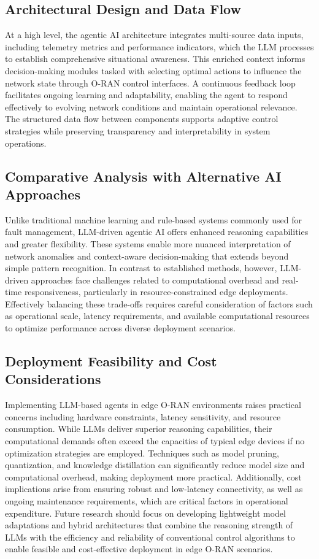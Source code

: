 \documentclass[sigconf]{acmart}
\begin{document}
\subsection{Architectural Design and Data Flow}
At a high level, the agentic AI architecture integrates multi-source data inputs, including telemetry metrics and performance indicators, which the LLM processes to establish comprehensive situational awareness. This enriched context informs decision-making modules tasked with selecting optimal actions to influence the network state through O-RAN control interfaces. A continuous feedback loop facilitates ongoing learning and adaptability, enabling the agent to respond effectively to evolving network conditions and maintain operational relevance. The structured data flow between components supports adaptive control strategies while preserving transparency and interpretability in system operations.

\subsection{Comparative Analysis with Alternative AI Approaches}
Unlike traditional machine learning and rule-based systems commonly used for fault management, LLM-driven agentic AI offers enhanced reasoning capabilities and greater flexibility. These systems enable more nuanced interpretation of network anomalies and context-aware decision-making that extends beyond simple pattern recognition. In contrast to established methods, however, LLM-driven approaches face challenges related to computational overhead and real-time responsiveness, particularly in resource-constrained edge deployments. Effectively balancing these trade-offs requires careful consideration of factors such as operational scale, latency requirements, and available computational resources to optimize performance across diverse deployment scenarios.

\subsection{Deployment Feasibility and Cost Considerations}
Implementing LLM-based agents in edge O-RAN environments raises practical concerns including hardware constraints, latency sensitivity, and resource consumption. While LLMs deliver superior reasoning capabilities, their computational demands often exceed the capacities of typical edge devices if no optimization strategies are employed. Techniques such as model pruning, quantization, and knowledge distillation can significantly reduce model size and computational overhead, making deployment more practical. Additionally, cost implications arise from ensuring robust and low-latency connectivity, as well as ongoing maintenance requirements, which are critical factors in operational expenditure. Future research should focus on developing lightweight model adaptations and hybrid architectures that combine the reasoning strength of LLMs with the efficiency and reliability of conventional control algorithms to enable feasible and cost-effective deployment in edge O-RAN scenarios.
\end{document}
